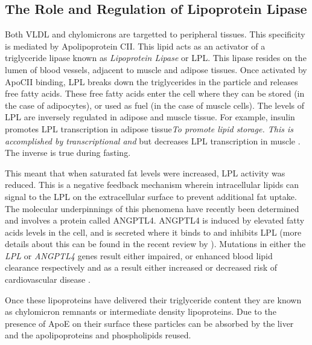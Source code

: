 \documentclass{tufte-handout}
\begin{document}
\subsection{The Role and Regulation of Lipoprotein Lipase}

Both VLDL and chylomicrons are targetted to peripheral tissues.  This specificity is mediated by Apolipoprotein CII.  This lipid acts as an activator of a triglyceride lipase known as \emph{Lipoprotein Lipase} or LPL.  This lipase resides on the lumen of blood vessels, adjacent to muscle and adipose tissues.  Once activated by ApoCII binding, LPL breaks down the triglycerides in the particle and releases free fatty acids.  These free fatty acids enter the cell where they can be stored (in the case of adipocytes), or used as fuel (in the case of muscle cells).  The levels of LPL are inversely regulated in adipose and muscle tissue.  For example, insulin promotes LPL transcription in adipose tissue\emph{To promote lipid storage.  This is accomplished by transcriptional and } but decreases LPL transcription in muscle \citep{Spooners1979}.  The inverse is true during fasting.

  This meant that when saturated fat levels were increased, LPL activity was reduced.  This is a negative feedback mechanism wherein intracellular lipids can signal to the LPL on the extracellular surface to prevent additional fat uptake.  The molecular underpinnings of this phenomena have recently been determined and involves a protein called ANGPTL4.  ANGPTL4 is induced by elevated fatty acids levels in the cell, and is secreted where it binds to and inhibits LPL (more details about this can be found in the recent review by \citet{Dijk2014}).  Mutations in either the \textit{LPL} or \textit{ANGPTL4} genes result either impaired, or enhanced blood lipid clearance respectively and as a result either increased or decreased risk of cardiovascular disease \citep{Article2016b}.

  Once these lipoproteins have delivered their triglyceride content they are known as chylomicron remnants or intermediate density lipoproteins.  Due to the presence of ApoE on their surface these particles can be absorbed by the liver and the apolipoproteins and phospholipids reused.
\end{document}

